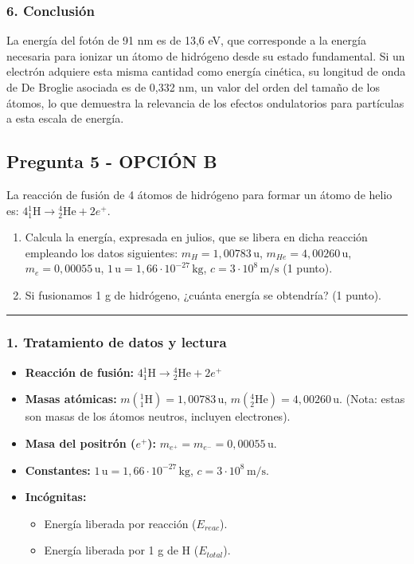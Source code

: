 \subsubsection*{6. Conclusión}
\begin{cajaconclusion}
La energía del fotón de 91 nm es de 13,6 eV, que corresponde a la energía necesaria para ionizar un átomo de hidrógeno desde su estado fundamental. Si un electrón adquiere esta misma cantidad como energía cinética, su longitud de onda de De Broglie asociada es de 0,332 nm, un valor del orden del tamaño de los átomos, lo que demuestra la relevancia de los efectos ondulatorios para partículas a esta escala de energía.
\end{cajaconclusion}

\newpage

\subsection{Pregunta 5 - OPCIÓN B}
\label{subsec:5B_2008_sep_ext}

\begin{cajaenunciado}
La reacción de fusión de 4 átomos de hidrógeno para formar un átomo de helio es: $4 {}_1^1\text{H} \to {}_2^4\text{He} + 2 e^{+}$.
\begin{enumerate}
    \item Calcula la energía, expresada en julios, que se libera en dicha reacción empleando los datos siguientes: $m_H=1,00783\,\text{u}$, $m_{He}=4,00260\,\text{u}$, $m_e=0,00055\,\text{u}$, $1\,\text{u}=1,66\cdot10^{-27}\,\text{kg}$, $c=3\cdot10^8\,\text{m/s}$ (1 punto).
    \item Si fusionamos 1 g de hidrógeno, ¿cuánta energía se obtendría? (1 punto).
\end{enumerate}
\end{cajaenunciado}
\hrule

\subsubsection*{1. Tratamiento de datos y lectura}
\begin{itemize}
    \item \textbf{Reacción de fusión:} $4 {}_1^1\text{H} \to {}_2^4\text{He} + 2 e^{+}$
    \item \textbf{Masas atómicas:} $m({}_1^1\text{H}) = 1,00783\,\text{u}$, $m({}_2^4\text{He}) = 4,00260\,\text{u}$. (Nota: estas son masas de los átomos neutros, incluyen electrones).
    \item \textbf{Masa del positrón ($e^+$):} $m_{e^+} = m_{e^-} = 0,00055\,\text{u}$.
    \item \textbf{Constantes:} $1\,\text{u}=1,66\cdot10^{-27}\,\text{kg}$, $c=3\cdot10^8\,\text{m/s}$.
    \item \textbf{Incógnitas:}
        \begin{itemize}
            \item Energía liberada por reacción ($E_{reac}$).
            \item Energía liberada por 1 g de H ($E_{total}$).
        \end{itemize}
\end{itemize}


